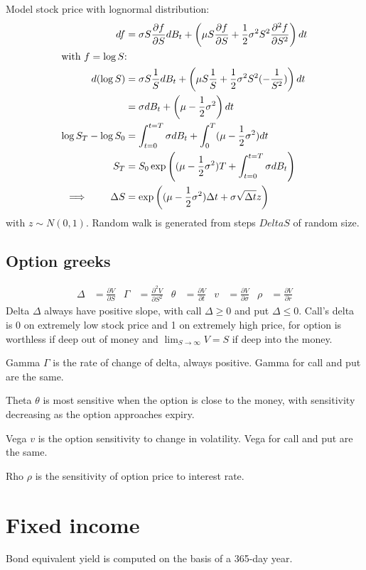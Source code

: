 \documentclass[9pt,twocolumn]{extarticle}
\begin{document}
Model stock price with lognormal distribution:
\begin{align*}
    df &= \sigma S \frac{\partial f}{\partial S} dB_t + \left(\mu S
    \frac{\partial f}{\partial S} + \frac{1}{2}\sigma^2S^2\frac{\partial^2
f}{\partial S^2}\right)dt \\
\intertext{with $f=\log S$:}
d(\log S) &= \sigma S \frac{1}{S} dB_t + \left(\mu S
\frac{1}{S} + \frac{1}{2}\sigma^2S^2(-\frac{1}{S^2})
\right)dt \\
&= \sigma dB_t + \left(\mu - \frac{1}{2}\sigma^2 \right)dt \\
\log S_T - \log S_0 &= \int_{t=0}^{t=T} \sigma dB_t + \int_0^T (\mu - \frac{1}{2}\sigma^2)dt \\
S_T &= S_0 \exp\left((\mu-\frac{1}{2}\sigma^2)T + \int_{t=0}^{t=T}\sigma dB_t
\right) \\
\implies\qquad \Delta S &= \exp\left((\mu-\frac{1}{2}\sigma^2)\Delta t + \sigma\sqrt{\Delta t} z \right)
\end{align*}
with $z\sim N(0,1)$. Random walk is generated from steps $Delta S$ of random size.

\subsection*{Option greeks}
\begin{align*}
\Delta &= \frac{\partial V}{\partial S} &
\Gamma &= \frac{\partial^2 V}{\partial S^2} &
\theta &= \frac{\partial V}{\partial t} &
v &= \frac{\partial V}{\partial\sigma} &
\rho &= \frac{\partial V}{\partial r}
\end{align*}
Delta $\Delta$ always have positive slope, with call $\Delta\ge0$ and put
$\Delta\le0$. Call's delta is 0 on extremely low stock price and 1 on extremely
high price, for option is worthless if deep out of money and
$\displaystyle\lim_{S\to\infty} V=S$ if deep into the money.

Gamma $\Gamma$ is the rate of change of delta, always positive. Gamma for call
and put are the same.

Theta $\theta$ is most sensitive when the option is close to the money, with
sensitivity decreasing as the option approaches expiry.

Vega $v$ is the option sensitivity to change in volatility. Vega for call and
put are the same.

Rho $\rho$ is the sensitivity of option price to interest rate.

\section{Fixed income}
Bond equivalent yield is computed on the basis of a 365-day year.
\end{document}
